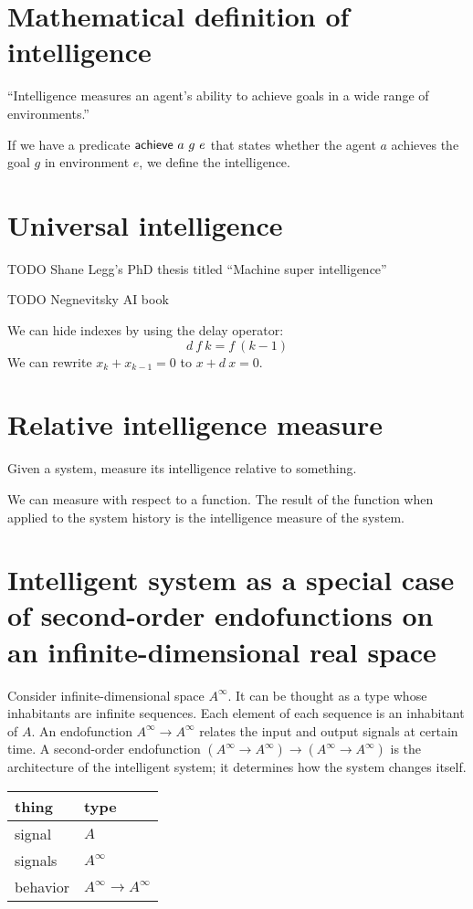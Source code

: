 \section{Mathematical definition of intelligence}

``Intelligence measures an agent's ability to achieve goals in a wide range
of environments.''
\cite{LeggPhd,LeggHutterFormal}

If we have a predicate \(\textsf{achieve}~a~g~e\) that states whether the agent \(a\) achieves the goal \(g\) in environment \(e\),
we define the intelligence.

\section{Universal intelligence}

TODO Shane Legg's PhD thesis titled ``Machine super intelligence'' \cite{LeggPhd}

TODO Negnevitsky AI book \cite{negnevitsky2005artificial}

We can hide indexes by using the delay operator:
\[
    d~f~k = f~(k-1)
\]
We can rewrite
\( x_k + x_{k-1} = 0 \)
to
\(x + d~x = 0\).

\section{Relative intelligence measure}

Given a system, measure its intelligence relative to something.

We can measure with respect to a function.
The result of the function when applied to the system history
is the intelligence measure of the system.

\section{Intelligent system as a special case of second-order endofunctions on an infinite-dimensional real space}

Consider infinite-dimensional space \(A^\infty\).
It can be thought as a type whose inhabitants are infinite sequences.
Each element of each sequence is an inhabitant of \(A\).
An endofunction \(A^\infty \to A^\infty\) relates the input and output signals at certain time.
A second-order endofunction \((A^\infty \to A^\infty) \to (A^\infty \to A^\infty)\) is the architecture of the intelligent system;
it determines how the system changes itself.

\begin{center}
    \begin{tabular}{ll}
        thing & type
        \\
        \hline
        signal & \(A\)
        \\
        signals & \(A^\infty\)
        \\
        behavior & \(A^\infty \to A^\infty\)
    \end{tabular}
\end{center}

